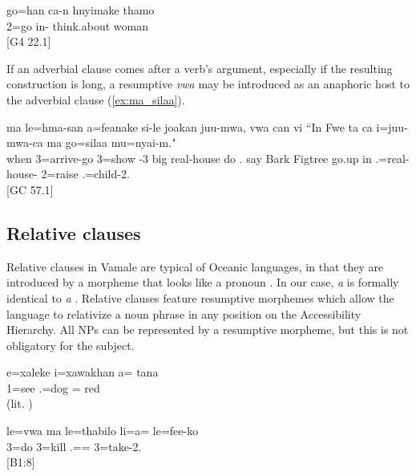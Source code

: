 \ea\gll go=han ca-n hnyimake thamo\\
 2=go in- think.about woman\\
\glt {} {[G4 22.1]}
\z

If an adverbial clause comes after a verb's argument, especially if the resulting construction is long, a resumptive \textit{vwa}  may be introduced as an anaphoric host to the adverbial clause (\ref{ex:ma_silaa}).

\ea \label{ex:ma_silaa}\gll ma le=hma-san a=feanake si-le joakan juu-mwa, {vwa} can vi ``In Fwe ta ca i=juu-mwa-ca ma go=silaa mu=nyai-m."\\
 when 3=arrive-go 3=show -3 big real-house do . say Bark Figtree go.up in .=real-house-  2=raise .=child-2.\\
\glt {} {[GC 57.1]}
\z

\subsection{Relative clauses}
\label{sec:RelCl}

Relative clauses in Vamale are typical of Oceanic languages, in that they are introduced by a morpheme that looks like a pronoun \parencite[516]{ross_morphosyntactic_2004}. In our case, \textit{a}  is formally identical to \textit{a} . Relative clauses feature resumptive morphemes which allow the language to relativize a noun phrase in any position on the Accessibility Hierarchy. All NPs can be represented by a resumptive morpheme, but this is not obligatory for the subject.

\ea
\gll e=xaleke i=xawakhan a= tana\\
 1=see .=dog = red\\
\glt {} (lit. )
\z


\ea\gll le=vwa ma le=thabilo li=a= le=fee-ko\\
 3=do  3=kill .== 3=take-2.\\
\glt {} {[B1:8]}
\z 

